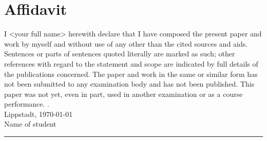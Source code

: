\chapter*{Affidavit}
I <your full name> herewith declare that I have composed the present paper and work by myself and without use of any other than the cited sources and aids. Sentences or parts of sentences quoted literally are marked as such; other references with regard to the statement and scope are indicated by full details of the publications concerned. The paper and work in the same or similar form has not been submitted to any examination body and has not been published. This paper was not yet, even in part, used in another examination or as a course performance.
. ~\\
Lippstadt,  \today\\[.6cm] %
Name of student\\ %
\rule[0.5em]{20em}{0.5pt}

\appendix




